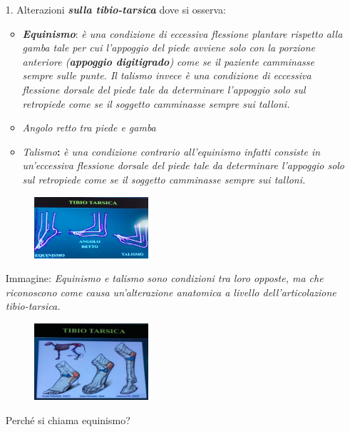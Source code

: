 \begin{itemize}
\item[1.]
  Alterazioni \textbf{\emph{sulla tibio-tarsica}} dove si osserva:
\begin{itemize}
\item
  \textbf{\emph{Equinismo}}: \emph{è una condizione di eccessiva flessione plantare rispetto alla gamba tale per cui l'appoggio del piede avviene solo con la porzione anteriore (\textbf{appoggio digitigrado}) come se il paziente camminasse sempre sulle punte. Il \emph{talismo} invece è una condizione di eccessiva flessione dorsale del piede tale da determinare l'appoggio solo sul retropiede come se il soggetto camminasse sempre sui talloni. }
\item
  \emph{Angolo retto tra piede e gamba}
\item
  \emph{Talismo}\textbf{:} \emph{è una condizione contrario all'equinismo infatti consiste in un'eccessiva flessione dorsale del piede tale da determinare l'appoggio solo sul retropiede come se il soggetto camminasse sempre sui talloni.}
\end{itemize}

\begin{figure}[!ht]
\centering
\includegraphics[width=0.4\textwidth]{016/image4.png}
\end{figure}

Immagine: \emph{Equinismo e talismo sono condizioni tra loro opposte, ma che riconoscono come causa un'alterazione anatomica a livello dell'\emph{articolazione tibio-tarsica}.}

\begin{figure}[!ht]
\centering
\includegraphics[width=0.4\textwidth]{016/image5.png}
\end{figure}

Perché si chiama equinismo?


\end{itemize}
